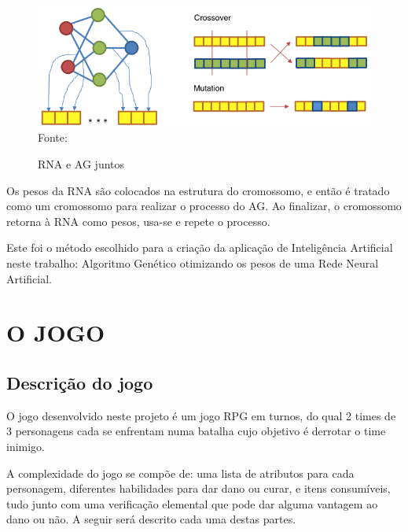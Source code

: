 \documentclass[
	12pt,					%
	openright,				%
	oneside,				%
	a4paper,				%
	bibjustif,				%
	chapter=TITLE,			%
	english,				%
	brazil,					%
	]{abntex2}
\newcommand{\source}[1]{\small Fonte: {#1}}
\begin{document}
	\begin{figure}[ht!]
		\centering
		\caption{RNA e AG juntos}
		\includegraphics[scale=0.7]{img/NeuralNetworkIntoChromosome.png}\\
		\vspace{0.5mm}
		\source{}
		\label{fig:nn-ag}
	\end{figure}
	
	Os pesos da RNA são colocados na estrutura do cromossomo,
	e então é tratado como um cromossomo para realizar o processo do AG.
	Ao finalizar, o cromossomo retorna à RNA como pesos,
	usa-se e repete o processo.
	
	Este foi o método escolhido para a criação da aplicação de Inteligência Artificial neste trabalho:
	Algoritmo Genético otimizando os pesos de uma Rede Neural Artificial.

\FloatBarrier
\newpage %
\chapter{O JOGO}
	
	\FloatBarrier
	\section{Descrição do jogo}
	O jogo desenvolvido neste projeto é um jogo RPG em turnos,
	do qual 2 times de 3 personagens cada se enfrentam numa batalha cujo objetivo é derrotar o time inimigo.
	
	A complexidade do jogo se compõe de:
	uma lista de atributos para cada personagem,
	diferentes habilidades para dar dano ou curar,
	e itens consumíveis,
	tudo junto com uma verificação elemental que pode dar alguma vantagem ao dano ou não.
	A seguir será descrito cada uma destas partes.
	
\end{document}
